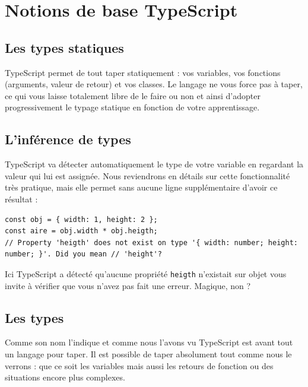 \documentclass{article}
\begin{document}

\section{Notions de base TypeScript}
\subsection{Les types statiques}
{\color{monOrange}TypeScript} permet de tout taper statiquement : vos variables, vos fonctions (arguments, valeur de retour) et vos classes. Le langage ne vous force pas à taper, ce qui vous laisse totalement libre de le faire ou non et ainsi d'adopter progressivement le typage statique en fonction de votre apprentissage.

\subsection{L'inférence de types}
{\color{monOrange}TypeScript}  va détecter automatiquement le type de votre variable en regardant la valeur qui lui est assignée. Nous reviendrons en détails sur cette fonctionnalité très pratique, mais elle permet sans aucune ligne supplémentaire d'avoir ce résultat :
\begin{verbatim}
const obj = { width: 1, height: 2 };
const aire = obj.width * obj.heigth;
// Property 'heigth' does not exist on type '{ width: number; height: number; }'. Did you mean // 'height'?
\end{verbatim}

Ici {\color{monOrange}TypeScript}  a détecté qu'aucune propriété {\tt heigth} n'existait sur objet vous invite à vérifier que vous n'avez pas fait une erreur. Magique, non ?

\subsection{Les types}
Comme son nom l'indique et comme nous l'avons vu {\color{monOrange}TypeScript}  est avant tout un langage pour taper. Il est possible de taper absolument tout comme nous le verrons : que ce soit les variables mais aussi les retours de fonction ou des situations encore plus complexes.
\end{document}
